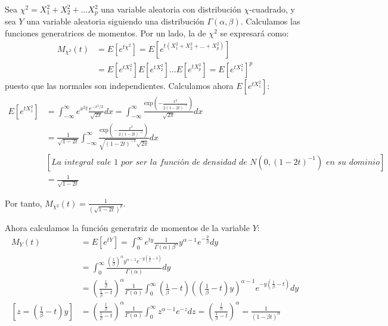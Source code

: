 \documentclass[a4paper, 10pt]{article} %
\begin{document}
Sea $\chi^2=X_1^2+X_2^2+\dots X_p^2$ una variable aleatoria con distribución $\chi$-cuadrado, y sea $Y$ una variable aleatoria siguiendo una distribución $\Gamma(\alpha, \beta)$. Calculamos las funciones generatrices de momentos. Por un lado, la de $\chi^2$ se expresará como:
\begin{align*}
  M_{\chi^2}(t)
  &=E\left[e^{t\chi^2}\right]=E\left[e^{t(X_1^2+X_2^2+\dots+X_p^2)}\right]\\
  &=E\left[e^{tX_1^2}\right]E\left[e^{tX_2^2}\right]\dots E\left[e^{tX_p^2}\right]
    =E\left[e^{tX_1^2}\right]^p
\end{align*}
puesto que las normales son independientes. Calculamos ahora $E\left[e^{tX_1^2}\right]$:
\begin{align*}
  E\left[e^{tX_1^2}\right]
  &=\int_{-\infty}^\infty e^{x^2t}\frac{e^{-x^2/2}}{\sqrt{2\pi}} dx
   =\int_{-\infty}^\infty\frac{\mathrm{exp}\left(-\frac{x^2}{2(1-2t)^{-1}}\right)}{\sqrt{2\pi}} dx\\
  &=\frac 1 {\sqrt{1-2t}}
    \int_{-\infty}^\infty\frac{\mathrm{exp}\left(-\frac{x^2}{2(1-2t)^{-1}}\right)}{\sqrt{(1-2t)^{-1}}\sqrt{2\pi}} dx\\
  &\left[\textit{La integral vale 1 por ser la función de densidad de }N(0,(1-2t)^{-1})\textit{ en su dominio}\right]\\
  &=\frac 1 {\sqrt{1-2t}}
\end{align*}

Por tanto, $M_{\chi^2}(t)=\frac 1 {(\sqrt{1-2t})^p}$.

Ahora calculamos la función generatriz de momentos de la variable $Y$:
\begin{align*}
  M_Y(t)&=E\left[e^{tY}\right]=\int_0^\infty e^{ty} \frac 1 {\Gamma(\alpha)\beta^\alpha}y^{\alpha-1}e^{-\frac y \beta} dy\\
  &=\int_0^\infty \frac{\left(\frac 1 \beta\right)^\alpha y^{\alpha-1}e^{-y\left(\frac 1 \beta - t\right)}}{\Gamma(\alpha)} dy\\
  &= \left(\frac{\frac 1 \beta}{\frac 1 \beta - t}\right)^\alpha\frac 1 {\Gamma(\alpha)}
     \int_0^\infty \left(\frac 1 \beta - t\right)\left(\left(\frac 1 \beta - t\right)y\right)^{\alpha-1}e^{-y\left(\frac 1 \beta - t\right)} dy\\
  \left[z=\left(\frac 1 \beta - t\right)y\right] &= \left(\frac{\frac 1 \beta}{\frac 1 \beta - t}\right)^\alpha\frac 1 {\Gamma(\alpha)}
     \int_0^\infty z^{\alpha-1}e^{-z} dz=
     \left(\frac{\frac 1 \beta}{\frac 1 \beta - t}\right)^\alpha=\frac 1 {(1 -\beta t)^\alpha}
\end{align*}
\end{document}
